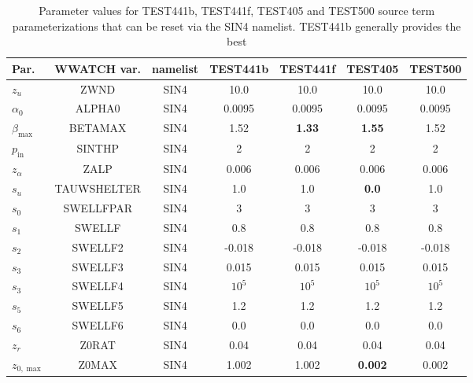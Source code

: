 \begin{landscape}
\begin{table} \begin{center}
\begin{tabular}{|l|c|c|c|c|c|c|} \hline \hline
Par.         &  WWATCH var.       & namelist & TEST441b & TEST441f & TEST405  & TEST500 \\
\hline
  $z_u$ &  ZWND                       & SIN4 & 10.0    & 10.0    & 10.0      & 10.0 \\
  $\alpha_0$ &  ALPHA0                & SIN4 & 0.0095  & 0.0095   & 0.0095    &  0.0095 \\
  $\beta_{\mathrm{max}}$ & BETAMAX    & SIN4 & 1.52    &\textbf{1.33}& \textbf{1.55}    &  1.52   \\
  $p_{\mathrm{in}}$ &  SINTHP         & SIN4 & 2       & 2       & 2         &  2      \\
  $z_\alpha$ &  ZALP                  & SIN4 & 0.006   & 0.006   & 0.006     &  0.006 \\
  $s_u$ &  TAUWSHELTER                & SIN4 & 1.0     & 1.0     & \textbf{0.0} & 1.0   \\
  $s_0$ &  SWELLFPAR                  & SIN4 & 3       & 3       & 3         &  3   \\
  $s_1$ &  SWELLF                     & SIN4 & 0.8     & 0.8     & 0.8       &  0.8 \\
  $s_2$ &  SWELLF2                    & SIN4 & -0.018  & -0.018  & -0.018    &  -0.018 \\
  $s_3$ &  SWELLF3                    & SIN4 &  0.015  &  0.015  &  0.015    &  0.015 \\
  $s_3$ &  SWELLF4                    & SIN4 & $10^5$  & $10^5$  & $10^5$    & $10^5$  \\
  $s_5$ &  SWELLF5                    & SIN4 & 1.2     & 1.2     & 1.2       &  1.2 \\
  $s_6$ &  SWELLF6                    & SIN4 & 0.0     & 0.0     & 0.0       &  0.0 \\
  $z_r$ &  Z0RAT                      & SIN4 & 0.04    & 0.04    & 0.04      &  0.04 \\
  $z_{0,\max}$ &  Z0MAX               & SIN4 & 1.002   & 1.002   &\textbf{0.002}&  0.002 \\
\hline
\end{tabular}
 \end{center}
\caption{Parameter values for TEST441b, TEST441f, TEST405 and TEST500 source term
parameterizations that can be reset via the SIN4 namelist. TEST441b generally provides the best 
}
\end{table}
\end{landscape}
